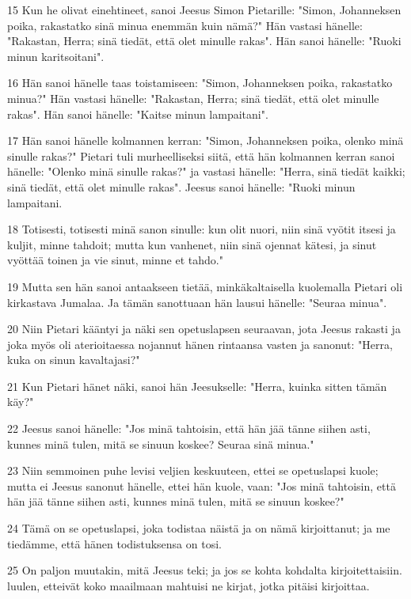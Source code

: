\par 15 Kun he olivat einehtineet, sanoi Jeesus Simon Pietarille: "Simon, Johanneksen poika, rakastatko sinä minua enemmän kuin nämä?" Hän vastasi hänelle: "Rakastan, Herra; sinä tiedät, että olet minulle rakas". Hän sanoi hänelle: "Ruoki minun karitsoitani".
\par 16 Hän sanoi hänelle taas toistamiseen: "Simon, Johanneksen poika, rakastatko minua?" Hän vastasi hänelle: "Rakastan, Herra; sinä tiedät, että olet minulle rakas". Hän sanoi hänelle: "Kaitse minun lampaitani".
\par 17 Hän sanoi hänelle kolmannen kerran: "Simon, Johanneksen poika, olenko minä sinulle rakas?" Pietari tuli murheelliseksi siitä, että hän kolmannen kerran sanoi hänelle: "Olenko minä sinulle rakas?" ja vastasi hänelle: "Herra, sinä tiedät kaikki; sinä tiedät, että olet minulle rakas". Jeesus sanoi hänelle: "Ruoki minun lampaitani.
\par 18 Totisesti, totisesti minä sanon sinulle: kun olit nuori, niin sinä vyötit itsesi ja kuljit, minne tahdoit; mutta kun vanhenet, niin sinä ojennat kätesi, ja sinut vyöttää toinen ja vie sinut, minne et tahdo."
\par 19 Mutta sen hän sanoi antaakseen tietää, minkäkaltaisella kuolemalla Pietari oli kirkastava Jumalaa. Ja tämän sanottuaan hän lausui hänelle: "Seuraa minua".
\par 20 Niin Pietari kääntyi ja näki sen opetuslapsen seuraavan, jota Jeesus rakasti ja joka myös oli aterioitaessa nojannut hänen rintaansa vasten ja sanonut: "Herra, kuka on sinun kavaltajasi?"
\par 21 Kun Pietari hänet näki, sanoi hän Jeesukselle: "Herra, kuinka sitten tämän käy?"
\par 22 Jeesus sanoi hänelle: "Jos minä tahtoisin, että hän jää tänne siihen asti, kunnes minä tulen, mitä se sinuun koskee? Seuraa sinä minua."
\par 23 Niin semmoinen puhe levisi veljien keskuuteen, ettei se opetuslapsi kuole; mutta ei Jeesus sanonut hänelle, ettei hän kuole, vaan: "Jos minä tahtoisin, että hän jää tänne siihen asti, kunnes minä tulen, mitä se sinuun koskee?"
\par 24 Tämä on se opetuslapsi, joka todistaa näistä ja on nämä kirjoittanut; ja me tiedämme, että hänen todistuksensa on tosi.
\par 25 On paljon muutakin, mitä Jeesus teki; ja jos se kohta kohdalta kirjoitettaisiin. luulen, etteivät koko maailmaan mahtuisi ne kirjat, jotka pitäisi kirjoittaa.


